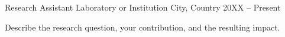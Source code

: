 
\begin{cventries}
  \cventry
    {Research Assistant}
    {Laboratory or Institution}
    {City, Country}
    {20XX -- Present}
    {
      \begin{cvitems}
        \item {Describe the research question, your contribution, and the resulting impact.}
      \end{cvitems}
    }
\end{cventries}
